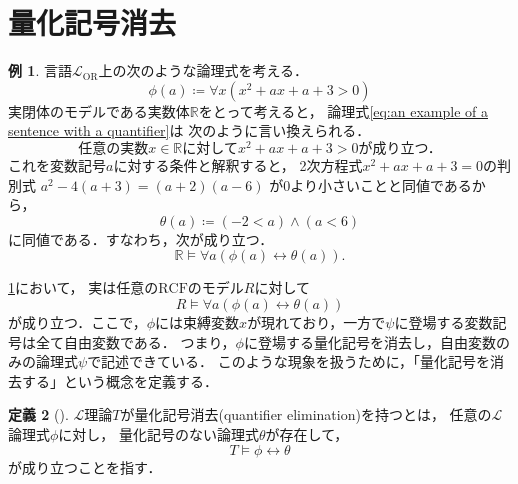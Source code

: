 \documentclass[uplatex, dvipdfmx]{jsarticle}
\numberwithin{equation}{section}
\newcommand{\R}{\mathbb{R}}
\newcommand{\RCF}{\mathrm{RCF}}
\theoremstyle{definition}
\newtheorem{definition}{定義}[section]
\newtheorem{example}[definition]{例}
\begin{document}
\section{量化記号消去}\label{section:4}

\begin{example} \label{example:quantifier elimination}
     言語$\mathcal{L}_\mathrm{OR}$上の次のような論理式を考える．
     \begin{equation} \label{eq:an example of a sentence with a quantifier}
          \phi(a) \coloneqq \forall x (x^2 + ax + a + 3 > 0)
     \end{equation}
     実閉体のモデルである実数体$\R$をとって考えると，
     論理式\eqref{eq:an example of a sentence with a quantifier}は
     次のように言い換えられる．
     \begin{equation}
          \text{任意の実数$x \in \R$に対して$x^2 + ax + a + 3 > 0$が成り立つ．}  
     \end{equation}
     これを変数記号$a$に対する条件と解釈すると，
     2次方程式$x^2 + ax + a + 3 = 0$の判別式
     $
     a^2 - 4 (a+3) = (a+2)(a-6)
     $
     が0より小さいことと同値であるから，
     \begin{equation}
          \theta(a) \coloneqq (-2 < a) \land (a < 6)
     \end{equation}
     に同値である．すなわち，次が成り立つ．
     \begin{equation}
          \R \models \forall a (\phi(a) \leftrightarrow \theta(a)).
     \end{equation}
\end{example}

\cref{example:quantifier elimination}において，
実は任意の$\RCF$のモデル$R$に対して
\begin{equation}
     R \models \forall a (\phi(a) \leftrightarrow \theta(a))
\end{equation}
が成り立つ．ここで，$\phi$には束縛変数$x$が現れており，一方で$\psi$に登場する変数記号は全て自由変数である．
つまり，$\phi$に登場する量化記号を消去し，自由変数のみの論理式$\psi$で記述できている．
このような現象を扱うために，「量化記号を消去する」という概念を定義する．


\begin{definition}[{\cite[Definition 3.1.1]{MR1924282}}]
$\mathcal{L}$理論$T$が量化記号消去(quantifier elimination)を持つとは，
任意の$\mathcal{L}$論理式$\phi$に対し，
量化記号のない論理式$\theta$が存在して，
\begin{equation}
     T \models \phi \leftrightarrow \theta
\end{equation}
が成り立つことを指す．
\end{definition}
\end{document}
